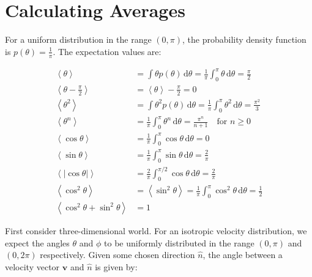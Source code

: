 \documentclass[12pt]{article}
\begin{document}



\pagebreak
\section*{Calculating Averages}



For a uniform distribution in the range $(0, \pi)$, the probability density function is $p(\theta) = \frac{1}{\pi}$. The expectation values are:

\begin{equation}
    \begin{split}
        \left\langle \theta \right\rangle &= \int \theta p(\theta) \, \mathrm{d}\theta = \frac{1}{\pi} \int_{0}^{\pi} \theta \, \mathrm{d}\theta = \frac{\pi}{2} \\
        \left\langle \theta - \frac{\pi}{2} \right\rangle &= \left\langle \theta \right\rangle - \frac{\pi}{2} = 0 \\
        \left\langle \theta^{2} \right\rangle &= \int \theta^{2} p(\theta) \, \mathrm{d}\theta = \frac{1}{\pi} \int_{0}^{\pi} \theta^{2} \, \mathrm{d}\theta = \frac{\pi^{2}}{3} \\
        \left\langle \theta^{n} \right\rangle &= \frac{1}{\pi} \int_{0}^{\pi} \theta^{n} \, \mathrm{d}\theta = \frac{\pi^{n}}{n+1} \quad \text{for } n \ge 0 \\
        \left\langle \cos{\theta} \right\rangle &= \frac{1}{\pi} \int_{0}^{\pi} \cos{\theta} \, \mathrm{d}\theta = 0 \\
        \left\langle \sin{\theta} \right\rangle &= \frac{1}{\pi} \int_{0}^{\pi} \sin{\theta} \, \mathrm{d}\theta = \frac{2}{\pi} \\
        \left\langle \left\lvert \cos{\theta} \right\rvert \right\rangle &= \frac{2}{\pi} \int_{0}^{\pi/2} \cos{\theta} \, \mathrm{d}\theta = \frac{2}{\pi} \\
        \left\langle \cos^{2}{\theta} \right\rangle &= \left\langle \sin^{2}{\theta} \right\rangle = \frac{1}{\pi} \int_{0}^{\pi} \cos^{2}{\theta} \, \mathrm{d}\theta = \frac{1}{2} \\
        \left\langle \cos^{2}{\theta} + \sin^{2}{\theta} \right\rangle &= 1
    \end{split}
\end{equation}

First consider three-dimensional world. For an isotropic velocity distribution, we expect the angles $\theta$ and $\phi$ to be uniformly distributed in the range $(0, \pi)$ and $(0, 2\pi)$ respectively. Given some chosen direction $\hat{n}$, the angle between a velocity vector $\mathbf{v}$ and $\hat{n}$ is given by:
\end{document}
